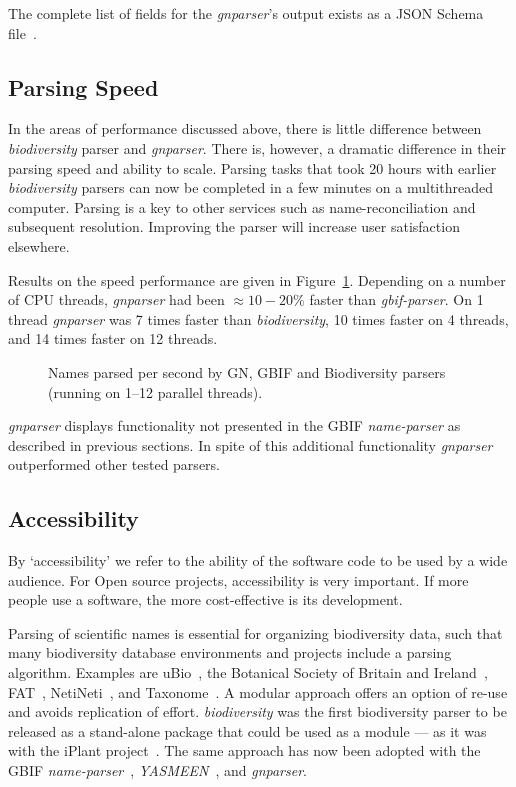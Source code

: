 \documentclass{bmcart}
\begin{document}
The complete list of fields for the \textit{gnparser}'s output exists as a JSON Schema file~\cite{gnparser-json}.

\subsection*{Parsing Speed}

In the areas of performance discussed above, there is little difference between \textit{biodiversity} parser and \textit{gnparser}. There is, however, a dramatic difference in their parsing speed and ability to scale. Parsing tasks that took 20 hours with earlier \textit{biodiversity} parsers can now be completed in a few minutes on a multithreaded computer. Parsing is a key to other services such as name-reconciliation and subsequent resolution.  Improving the parser will increase user satisfaction elsewhere.

Results on the speed performance are given in Figure~\ref{figure:throughput}.  Depending on a number of CPU threads, \textit{gnparser} had been $\approx10-20\%$ faster than \textit{gbif-parser}. On 1 thread \textit{gnparser} was 7 times faster than \textit{biodiversity}, 10 times faster on 4 threads, and 14 times faster on 12 threads.

\begin{figure}
  \begin{center}

    \caption{Names parsed per second by GN, GBIF and Biodiversity parsers
      (running on 1--12 parallel threads).}
    \label{figure:throughput}

  \end{center}
\end{figure}

\textit{gnparser} displays functionality not presented in the GBIF \textit{name-parser} as described in previous sections. In spite of this additional functionality \textit{gnparser} outperformed other tested parsers.

\subsection*{Accessibility}

By `accessibility' we refer to the ability of the software code to be used by a wide audience. For Open source projects, accessibility is very important. If more people use a software, the more cost-effective is its development.

Parsing of scientific names is essential for organizing biodiversity data, such that many biodiversity database environments and projects include a parsing algorithm. Examples are uBio~\cite{ubio:parser}, the Botanical Society of Britain and Ireland~\cite{botsociety:parser}, FAT~\cite{Sautter2006}, NetiNeti~\cite{Akella2012}, and Taxonome~\cite{Kluyver2013}. A modular approach offers an option of re-use and avoids replication of effort. \textit{biodiversity} was the first biodiversity parser to be released as a stand-alone package that could be used as a module --- as it was with the iPlant project~\cite{Boyle2013}.  The same approach has now been adopted with the GBIF \textit{name-parser}~\cite{gbifNameParser}, \textit{YASMEEN}~\cite{VandenBerghe2015}, and \textit{gnparser}.
\end{document}
